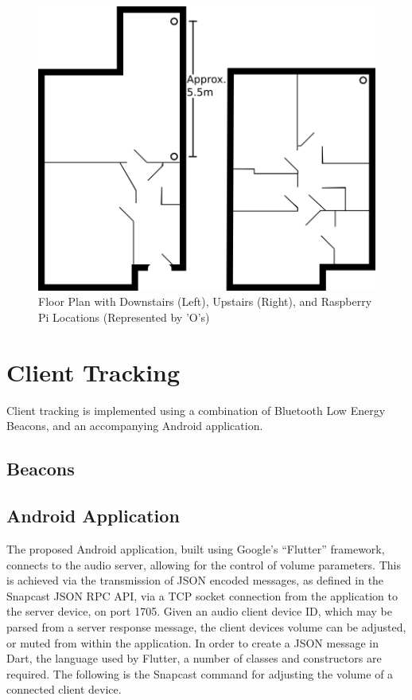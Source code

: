 \documentclass[11pt,a4paper,headinclude=false,footinclude=false]{scrreprt}
\begin{document}
\begin{figure}[H]
\includegraphics{ConceptsModellingDesign/floorplan.png}
\centering
\caption{Floor Plan with Downstairs (Left), Upstairs (Right), and Raspberry Pi
Locations (Represented by 'O's)}
\label{floorplan}
\end{figure}

\section{Client Tracking}\label{client-tracking-1}

Client tracking is implemented using a combination of Bluetooth Low
Energy Beacons, and an accompanying Android application.

\subsection{Beacons}\label{beacons}

\subsection{Android Application}\label{android-application}

The proposed Android application, built using Google's ``Flutter''
framework, connects to the audio server, allowing for the control of
volume parameters. This is achieved via the transmission of JSON encoded
messages, as defined in the Snapcast JSON RPC API\cite{snaprpc}, via a
TCP socket connection from the application to the server device, on port
1705. Given an audio client device ID, which may be parsed from a server
response message, the client devices volume can be adjusted, or muted
from within the application. In order to create a JSON message in Dart,
the language used by Flutter, a number of classes and constructors are
required. The following is the Snapcast command for adjusting the volume
of a connected client device.
\end{document}
